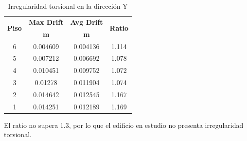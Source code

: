 \begin{table}[h!]
  \centering
  \caption{Irregularidad torsional en la dirección Y}
    \begin{tabular}{|c|c|c|c|}
    \hline
    \multicolumn{1}{|c|}{\multirow{2}[4]{*}{\textbf{Piso}}} & \multicolumn{1}{p{5.39em}|}{\textbf{Max Drift}} & \multicolumn{1}{p{5.39em}|}{\textbf{Avg Drift}} & \multicolumn{1}{c|}{\multirow{2}[4]{*}{\textbf{Ratio}}} \\
\cline{2-3}          & \multicolumn{1}{c|}{\textbf{m}} & \multicolumn{1}{c|}{\textbf{m}} &  \\
    \hline
    6     & 0.004609 & 0.004136 & 1.114 \\
    \hline
    5     & 0.007212 & 0.006692 & 1.078 \\
    \hline
    4     & 0.010451 & 0.009752 & 1.072 \\
    \hline
    3     & 0.01278 & 0.011904 & 1.074 \\
    \hline
    2     & 0.014642 & 0.012545 & 1.167 \\
    \hline
    1     & 0.014251 & 0.012189 & 1.169 \\
    \hline
    \end{tabular}%
  \label{tab:addlabel}%
\end{table}%

El ratio no supera 1.3, por lo que el edificio en estudio no presenta irregularidad torsional.


